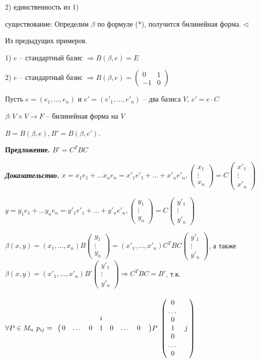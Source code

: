 2) единственность из 1)

существование: Определим $\beta$ по формуле (*), получится билинейная форма. $\lhd$

\vspace{\baselineskip}
Из предыдущих примеров.

1) $e$ -- стандартный базис $\Rightarrow B(\beta, e) = E$

2) $e$ -- стандартный базис $\Rightarrow B(\beta, e) = \begin{pmatrix} 0 & 1 \\ -1 & 0 \end{pmatrix} $

\vspace{\baselineskip}
Пусть $e = (e_1, \dots, e_n)$ и $e' = (e'_1, \dots, e'_n)$ -- два базиса $V$, $e' = e \cdot C$

$\beta : V \times V \rightarrow F$ -- билинейная форма на $V$

$B = B(\beta, e), B' = B(\beta, e')$.

\vspace{\baselineskip}
\textbf{Предложение.} $B' = C^{T} BC$

\vspace{\baselineskip}
\textbf{\textit{Доказательство.}} $x = x_1 e_1 + \dots x_n e_n = x'_1 e'_1 + \dots + x'_n e'_n, \begin{pmatrix} x_1 \\ \vdots \\ x_n \end{pmatrix} = C \begin{pmatrix} x'_1 \\ \vdots \\ x'_n \end{pmatrix}$

$y = y_1 e_1 + \dots y_n e_n = y'_1 e'_1 + \dots + y'_n e'_n, \begin{pmatrix} y_1 \\ \vdots \\ y_n \end{pmatrix} = C \begin{pmatrix} y'_1 \\ \vdots \\ y'_n \end{pmatrix}$

$\beta(x,y) = (x_1, \dots, x_n) B \begin{pmatrix} y_1 \\ \vdots \\ y_n \end{pmatrix} = (x'_1, \dots, x'_n) C^T B C \begin{pmatrix} y'_1 \\ \vdots \\ y'_n \end{pmatrix}$, а также $\beta(x,y) = (x'_1, \dots, x'_n) B' \begin{pmatrix} y'_1 \\ \vdots \\ y'_n \end{pmatrix} \Rightarrow C^{T}BC = B'$, т.к. $\forall P \in M_n \ p_{ij} = \bordermatrix{ 
& & & & i & & & &  \cr 
& 0 & \dots & 0 & 1 & 0 & \dots & 0}  P \bordermatrix{ &  \cr
& 0  \cr
& \dots  \cr
& 0  \cr 
& 1 & j  \cr
& 0  \cr
& \dots  \cr
& 0  \cr
} $

